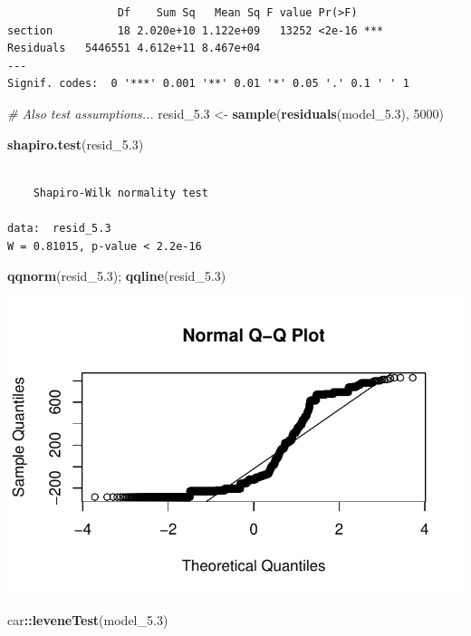\documentclass[
  british,
  10pt,
]{article}
\newenvironment{Shaded}{\begin{snugshade}}{\end{snugshade}}
\newcommand{\CommentTok}[1]{\textcolor[rgb]{0.56,0.35,0.01}{\textit{#1}}}
\newcommand{\DecValTok}[1]{\textcolor[rgb]{0.00,0.00,0.81}{#1}}
\newcommand{\FloatTok}[1]{\textcolor[rgb]{0.00,0.00,0.81}{#1}}
\newcommand{\FunctionTok}[1]{\textcolor[rgb]{0.13,0.29,0.53}{\textbf{#1}}}
\newcommand{\NormalTok}[1]{#1}
\newcommand{\OtherTok}[1]{\textcolor[rgb]{0.56,0.35,0.01}{#1}}
\newcommand{\SpecialCharTok}[1]{\textcolor[rgb]{0.81,0.36,0.00}{\textbf{#1}}}
\begin{document}
\begin{verbatim}
                 Df    Sum Sq   Mean Sq F value Pr(>F)    
section          18 2.020e+10 1.122e+09   13252 <2e-16 ***
Residuals   5446551 4.612e+11 8.467e+04                   
---
Signif. codes:  0 '***' 0.001 '**' 0.01 '*' 0.05 '.' 0.1 ' ' 1
\end{verbatim}

\begin{Shaded}
\begin{Highlighting}[]
\CommentTok{\# Also test assumptions...}
\NormalTok{resid\_5}\FloatTok{.3} \OtherTok{\textless{}{-}} \FunctionTok{sample}\NormalTok{(}\FunctionTok{residuals}\NormalTok{(model\_5}\FloatTok{.3}\NormalTok{), }\DecValTok{5000}\NormalTok{)}

\FunctionTok{shapiro.test}\NormalTok{(resid\_5}\FloatTok{.3}\NormalTok{)}
\end{Highlighting}
\end{Shaded}

\begin{verbatim}

    Shapiro-Wilk normality test

data:  resid_5.3
W = 0.81015, p-value < 2.2e-16
\end{verbatim}

\begin{Shaded}
\begin{Highlighting}[]
\FunctionTok{qqnorm}\NormalTok{(resid\_5}\FloatTok{.3}\NormalTok{); }\FunctionTok{qqline}\NormalTok{(resid\_5}\FloatTok{.3}\NormalTok{)}
\end{Highlighting}
\end{Shaded}

\begin{center}
\includegraphics[width=0.6\linewidth,height=\textheight,keepaspectratio]{BCB744_Biostats_Prac_Exam_2025_files/figure-pdf/chunk19-1.pdf}
\end{center}

\begin{Shaded}
\begin{Highlighting}[]
\NormalTok{car}\SpecialCharTok{::}\FunctionTok{leveneTest}\NormalTok{(model\_5}\FloatTok{.3}\NormalTok{)}
\end{Highlighting}
\end{Shaded}
\end{document}
